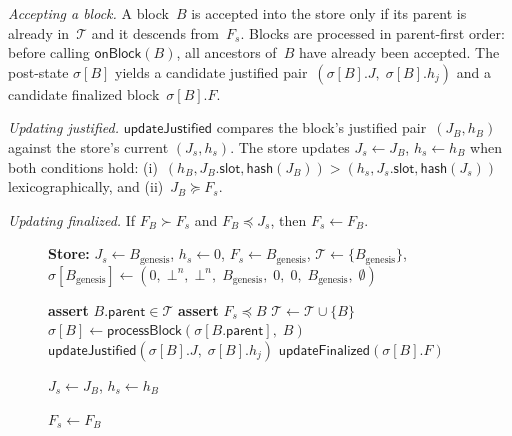 \ifx\litemode\undefined\documentclass{article}\fi
\theoremstyle{plain}
\theoremstyle{definition}
\theoremstyle{remark}
\begin{document}
\emph{Accepting a block.}
A block~$B$ is accepted into the store only if its parent is already in~$\mathcal{T}$ and it descends from~$F_s$.
Blocks are processed in parent-first order: before calling $\textsf{onBlock}(B)$, all ancestors of~$B$ have already been accepted.
The post-state $\sigma[B]$ yields a candidate justified pair~$(\sigma[B].J,\; \sigma[B].h_j)$ and a candidate finalized block~$\sigma[B].F$.

\emph{Updating justified.}
$\textsf{updateJustified}$ compares the block's justified pair~$(J_B, h_B)$ against the store's current $(J_s, h_s)$.
The store updates $J_s \gets J_B$, $h_s \gets h_B$ when both conditions hold:
(i)~$(h_B, J_B.\mathsf{slot}, \mathsf{hash}(J_B)) > (h_s, J_s.\mathsf{slot}, \mathsf{hash}(J_s))$ lexicographically, and
(ii)~$J_B \succeq F_s$.

\emph{Updating finalized.}
If $F_B \succ F_s$ and $F_B \preceq J_s$, then $F_s \gets F_B$.

\begin{figure}[h!]
\centering
\begin{boxedminipage}{\textwidth}
\begin{algorithmic}[1]

\State \textbf{Store:} $J_s \gets B_{\mathrm{genesis}}$, \; $h_s \gets 0$, \; $F_s \gets B_{\mathrm{genesis}}$, \; $\mathcal{T} \gets \{B_{\mathrm{genesis}}\}$, \; $\sigma[B_{\mathrm{genesis}}] \gets (0,\; \bot^n,\; \bot^n,\; B_{\mathrm{genesis}},\; 0,\; 0,\; B_{\mathrm{genesis}},\; \emptyset)$
\vspace{3pt}

  \State \textbf{assert} $B.\mathsf{parent} \in \mathcal{T}$ 
  \State \textbf{assert} $F_s \preceq B$ 
  \State $\mathcal{T} \gets \mathcal{T} \cup \{B\}$
  \State $\sigma[B] \gets \textsf{processBlock}(\sigma[B.\mathsf{parent}],\; B)$
  \State $\textsf{updateJustified}(\sigma[B].J,\; \sigma[B].h_j)$
  \State $\textsf{updateFinalized}(\sigma[B].F)$
\EndFunction
\vspace{3pt}

    \State $J_s \gets J_B$, \; $h_s \gets h_B$
  \EndIf
\EndFunction
\vspace{3pt}

    \State $F_s \gets F_B$
  \EndIf
\EndFunction

\end{algorithmic}
\end{boxedminipage}
\end{figure}
\end{document}
